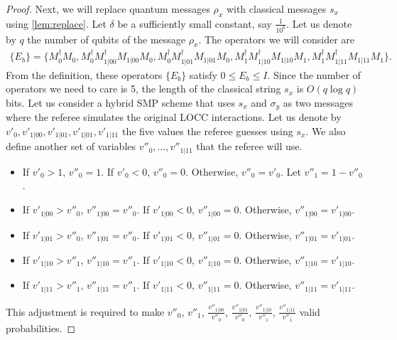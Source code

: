 \begin{proof}
    Next, we will replace quantum messages $\rho_x$ with classical messages $s_x$ using \cref{lem:replace}. Let $\delta$ be a sufficiently small constant, say $\frac{1}{10^6}$. Let us denote by $q$ the number of qubits of the message $\rho_x$. The operators we will consider are 
    \begin{align*}
        \{E_b\} = \{ M_0^\dagger M_0, M_0^\dagger M_{1|00}^\dagger M_{1|00} M_0, M_0^\dagger M_{1|01}^\dagger M_{1|01} M_0, M_1^\dagger M_{1|10}^\dagger M_{1|10} M_1,  M_1^\dagger M_{1|11}^\dagger M_{1|11} M_1 \}.
    \end{align*}
    From the definition, these operators $\{E_b\}$ satisfy $0 \leq E_b \leq I$.
    Since the number of operators we need to care is 5, the length of the classical string $s_x$ is $O(q \log q)$ bits. Let us consider a hybrid SMP scheme that uses $s_x$ and $\sigma_y$ as two messages where the referee simulates the original LOCC interactions. Let us denote by $v'_0, v'_{1|00}, v'_{1|01}, v'_{1|01}, v'_{1|11}$ the five values the referee guesses using $s_x$. We also define another set of variables $v''_0, \ldots, v''_{1|11}$ that the referee will use.
    \begin{itemize}
\item    If $v'_0 > 1$, $v''_0 = 1$. If $v'_0 < 0$, $v''_0 = 0$. Otherwise, $v''_0 = v'_0$. Let $v''_1 = 1-v''_0$.
    
\item    If $v'_{1|00} > v''_0$, $v''_{1|00} = v''_0$. If $v'_{1|00} < 0$, $v''_{1|00} = 0$. Otherwise, $v''_{1|00} = v'_{1|00}$.
\item    If $v'_{1|01} > v''_0$, $v''_{1|01} = v''_0$. If $v'_{1|01} < 0$, $v''_{1|01} = 0$. Otherwise, $v''_{1|01} = v'_{1|01}$.
\item    If $v'_{1|10} > v''_1$, $v''_{1|10} = v''_1$. If $v'_{1|10} < 0$, $v''_{1|10} = 0$. Otherwise, $v''_{1|10} = v'_{1|10}$.
\item   If $v'_{1|11} > v''_1$, $v''_{1|11} = v''_1$. If $v'_{1|11} < 0$, $v''_{1|11} = 0$. Otherwise, $v''_{1|11} = v'_{1|11}$.
    \end{itemize}
    This adjustment is required to make $v''_{0}$, $v''_{1}$, $\frac{v''_{1|00}}{v''_{0}}$, $\frac{v''_{1|01}}{v''_{0}}$, $\frac{v''_{1|10}}{v''_{1}}$, $\frac{v''_{1|11}}{v''_{1}}$ valid probabilities. 
    

\end{proof}
